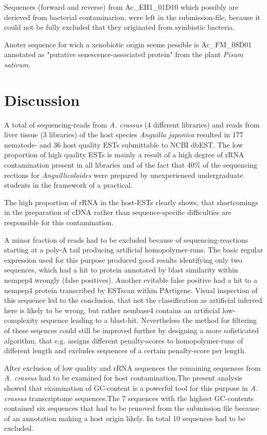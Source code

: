 \documentclass[12pt,a4paper]{article}
\begin{document}
Sequences (forward and reverse) from Ac\_EH1\_01D10 which possibly are
derieved from bacterial contaminarion, were left in the
submission-file, because it could not be fully excluded that they
originated from symbiotic bacteria.

Anoter sequence for wich a xenobiotic origin seems pessible is
Ac\_FM\_08D01 annotated as "putative senescence-associated protein"
from the plant \textit{Pisum sativum}.

\section*{Discussion}

A total of  sequencing-reads from
\textit{A. crassus} (4 different libraries) and
 reads from liver tissue (3 libraries)
of the host species \textit{Anguilla japonica} resulted in
177 nematode- and
36 host quality ESTs submittable to NCBI
dbEST. The low proportion of high quality ESTs is mainly a result of a
high degree of rRNA contamination present in all libraries and of the
fact that 40\% of the sequencing rections for
\textit{Anguillicoloides} were prepared by unexperienced undergraduate
students in the framework of a practical.

The high proportion of rRNA in the host-ESTs clearly shows, that
shortcomings in the preparation of cDNA rather than sequence-specific
difficulties are responsible for this contamination.

A minor fraction of reads had to be excluded because of
sequencing-reactions starting at a poly-A tail producing artificial
homopolymer-runs. The basic regular expression used for this purpose
produced good results identifying only two sequences, which had a hit
to protein annotated by blast similarity within nempep4 wrongly (false
positives). Another evitable false positive had a hit to a nempep4
protein transcribed by ESTscan\cite{estscan} within PArtigene. Visual
inspection of this sequence led to the conclusion, that not the
classification as artificial inferred here is likely to be wrong, but
rather nembase4 contains an artificial low-complexity sequence leading
to a blast-hit. Nevertheless the method for filtering of these
seqences could still be improved further by designing a more
sofisticated algorithm, that e.g. assigns different penalty-scores to
homopolymer-runs of different length and excludes sequences of a
certain penalty-score per length.

After exclusion of low quality and rRNA sequences the remaining
sequences from \textit{A. crassus} had to be examined for host
contamination.The present analysis showed that examination of
GC-content is a powerful tool for this purpose in \textit{A. crassus}
transcriptome sequences.The 7 sequences with the highest GC-contents
contained six sequences that had to be removed from the submission
file because of an annotation making a host origin likely. In total 10
sequences had to be excluded.
\end{document}
